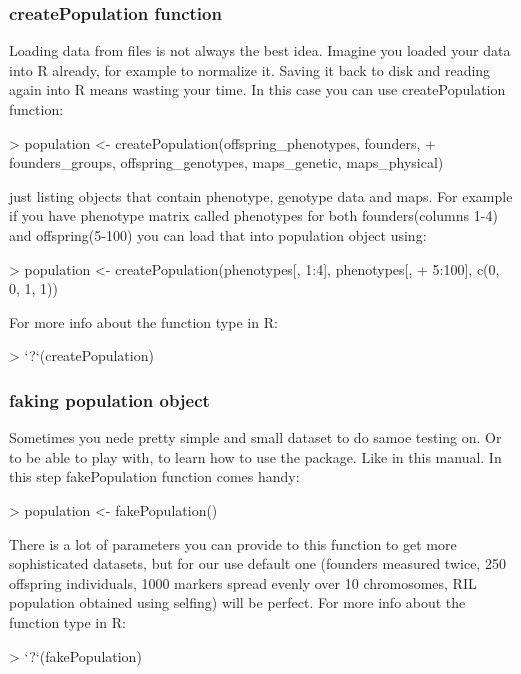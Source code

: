 \documentclass{article}
\begin{document}
\subsubsection{createPopulation function}
Loading data from files is not always the best idea. Imagine you loaded your data into R already, for example to normalize it. Saving it back to disk and reading again into R means wasting your time. In this case you can use createPopulation function:
\begin{Schunk}
\begin{Sinput}
> population <- createPopulation(offspring_phenotypes, founders, 
+     founders_groups, offspring_genotypes, maps_genetic, maps_physical)
\end{Sinput}
\end{Schunk}
just listing objects that contain phenotype, genotype data and maps. For example if you have phenotype matrix called phenotypes for both founders(columns 1-4) and offspring(5-100) you can load that into population object using:
\begin{Schunk}
\begin{Sinput}
> population <- createPopulation(phenotypes[, 1:4], phenotypes[, 
+     5:100], c(0, 0, 1, 1))
\end{Sinput}
\end{Schunk}
{\noindent}For more info about the function type in R:
\begin{Schunk}
\begin{Sinput}
> `?`(createPopulation)
\end{Sinput}
\end{Schunk}
\subsubsection{faking population object}
Sometimes you nede pretty simple and small dataset to do samoe testing on. Or to be able to play with, to learn how to use the package. Like in this manual. In this step fakePopulation function comes handy: 
\begin{Schunk}
\begin{Sinput}
> population <- fakePopulation()
\end{Sinput}
\end{Schunk}
{\noindent}There is a lot of parameters you can provide to this function to get more sophisticated datasets, but for our use default one (founders measured twice, 250 offspring individuals, 1000 markers spread evenly over 10 chromosomes, 
RIL population obtained using selfing) will be perfect. For more info about the function type in R:
\begin{Schunk}
\begin{Sinput}
> `?`(fakePopulation)
\end{Sinput}
\end{Schunk}
\newpage
\end{document}
